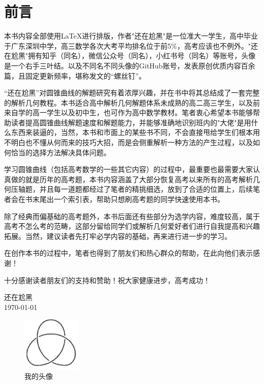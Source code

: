 \documentclass[12pt,a4paper, oneside,UTF8]{ctexbook}
\begin{document}

\frontmatter
\pagestyle{frontmatter} %
\chapter*{前言}
本书内容全部使用\LaTeX{}进行排版，作者"还在尬黑"是一位准大一学生，高中毕业于广东深圳中学，高三数学各次大考平均排名位于前5\%，高考应该也不例外。"还在尬黑"拥有知乎（同名），微信公众号（同名），小红书号（同名）等账号，头像是一个右手三叶结。以及不同名不同头像的GitHub账号，发表原创优质内容百余篇，且固定更新频率，堪称发文的“螺丝钉”。

“还在尬黑”对圆锥曲线的解题研究有着浓厚兴趣，并在书中将其总结成了一套完整的解析几何教程。本书适合高中解析几何解题体系未成熟的高二高三学生，以及前来自学的高一学生以及初中生，也可作为高中数学教材。笔者衷心希望本书能够帮助读者提高圆锥曲线解题速度和解题能力，并能够准确地识别班内的"大佬"是用什么东西来装逼的，当然，本书和市面上的某些书不同，不会直接甩给学生们根本用不明白也不懂从何而来的技巧大招，而是会侧重解析一种方法的产生过程，以及如何恰当的选择方法解决具体问题。

学习圆锥曲线（包括高考数学的一些其它内容）的过程中，最重要也最需要大家认真做的就是历年的高考题，本书内容涵盖了大部分恢复高考以来所有的高考解析几何压轴题，并且每一道题都经过了笔者的精挑细选，放到了合适的位置上，后续笔者会在书末尾出一个索引表，帮助只想刷高考题的同学快速使用本书。

除了经典而偏基础的高考题外，本书后面还有些部分为选学内容，难度较高，属于高考不怎么考的范畴，这部分留给同学们或解析几何爱好者们进行自我提高和兴趣拓展。当然，建议读者先打牢必学内容的基础，再来进行进一步的学习。

在创作本书的过程中，笔者也得到了朋友们和热心群众的帮助，在此向他们表示感谢！

十分感谢读者朋友们的支持和赞助！祝大家健康进步，高考成功！
\begin{flushright}
    \vspace{2\baselineskip} %
    \kt 还在尬黑 \\ %
    \today
\end{flushright}
\begin{figure}[htbp]
	\centering
    \includegraphics[width=0.25\textwidth]{flg/logo.png}%
	\caption{我的头像}
	\label{fig0-1}
\end{figure}

\newpage
{}%
\tableofcontents
\thispagestyle{tocmatter} 
\mainmatter
\pagestyle{mainmatter} %




\end{document}
